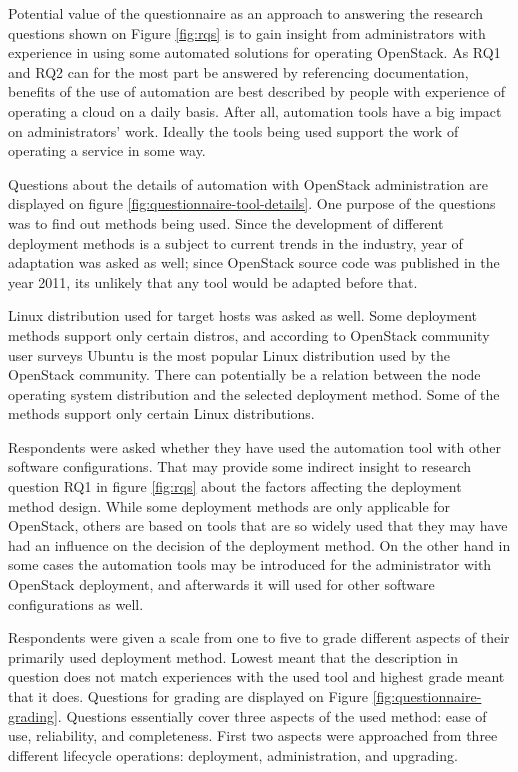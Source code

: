 \documentclass[officiallayout]{tktla}
\begin{document}
Potential value of the questionnaire as an approach to answering the research
questions shown on Figure \ref{fig:rqs} is to gain insight from administrators
with experience in using some automated solutions for operating OpenStack. As
RQ1 and RQ2 can for the most part be answered by referencing documentation,
benefits of the use of automation are best described by people with experience
of operating a cloud on a daily basis. After all, automation tools have a big
impact on administrators' work. Ideally the tools being used support the work
of operating a service in some way.

Questions about the details of automation with OpenStack administration are
displayed on figure \ref{fig:questionnaire-tool-details}. One purpose of the
questions was to find out methods being used. Since the development of
different deployment methods is a subject to current trends in the industry,
year of adaptation was asked as well; since OpenStack source code was published
in the year 2011, its unlikely that any tool would be adapted before that.

Linux distribution used for target hosts was asked as well. Some deployment
methods support only certain distros, and according to OpenStack community user
surveys \cite{openstack-user-survey-2018} Ubuntu is the most popular Linux
distribution used by the OpenStack community. There can potentially be a
relation between the node operating system distribution and the selected
deployment method. Some of the methods support only certain Linux
distributions.

Respondents were asked whether they have used the automation tool with other
software configurations. That may provide some indirect insight to research
question RQ1 in figure \ref{fig:rqs} about the factors affecting the deployment
method design. While some deployment methods are only applicable for OpenStack,
others are based on tools that are so widely used that they may have had an
influence on the decision of the deployment method. On the other hand in some
cases the automation tools may be introduced for the administrator with
OpenStack deployment, and afterwards it will used for other software
configurations as well.

Respondents were given a scale from one to five to grade different aspects of
their primarily used deployment method. Lowest meant that the description in
question does not match experiences with the used tool and highest grade meant
that it does. Questions for grading are displayed on Figure
\ref{fig:questionnaire-grading}. Questions essentially cover three aspects of
the used method: ease of use, reliability, and completeness. First two aspects
were approached from three different lifecycle operations: deployment,
administration, and upgrading.
\end{document}
